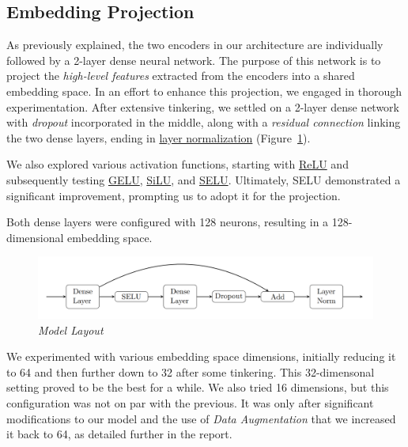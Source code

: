 \documentclass[10pt,twocolumn,letterpaper]{article}
\begin{document}
\subsection{Embedding Projection}
As previously explained, the two encoders in our architecture are individually followed by a 2-layer dense neural network. The purpose of this network is to project the \textit{high-level features} extracted from the encoders into a shared embedding space.
In an effort to enhance this projection, we engaged in thorough experimentation.
After extensive tinkering, we settled on a 2-layer dense network with \textit{dropout} incorporated in the middle, along with a \textit{residual connection} linking the two dense layers, ending in \href{https://keras.io/api/layers/normalization_layers/layer_normalization/}{layer normalization} (Figure\ \ref{fig:ml}).

We also explored various activation functions, starting with \href{https://keras.io/api/layers/activation_layers/relu/}{ReLU} and subsequently testing \href{https://www.tensorflow.org/api_docs/python/tf/keras/activations/gelu}{GELU}, \href{https://www.tensorflow.org/api_docs/python/tf/nn/silu}{SiLU}, and \href{https://www.tensorflow.org/api_docs/python/tf/nn/selu}{SELU}. Ultimately, SELU demonstrated a significant improvement, prompting us to adopt it for the projection.

Both dense layers were configured with 128 neurons, resulting in a 128-dimensional embedding space.

\begin{figure}
   \centering
   \includegraphics[width=1\linewidth]{img/Tikz_Model.png}
   \caption{\textit{Model Layout}}
   \label{fig:ml}
\end{figure}  

We experimented with various embedding space dimensions, initially reducing it to 64 and then further down to 32 after some tinkering. This 32-dimensonal setting proved to be the best for a while. We also tried 16 dimensions, but this configuration was not on par with the previous. It was only after significant modifications to our model and the use of \textit{Data Augmentation} that we increased it back to 64, as detailed further in the report.
\end{document}
